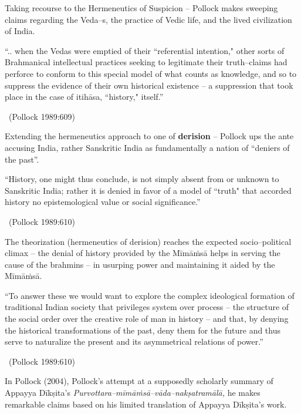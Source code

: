 Taking recourse to the Hermeneutics of Suspicion – Pollock makes sweeping claims regarding the Veda–s, the practice of Vedic life, and the lived civilization of India.

\begin{myquote}
“.. when the Vedas were emptied of their “referential intention," other sorts of Brahmanical intellectual practices seeking to legitimate their truth–claims had perforce to conform to this special model of what counts as knowledge, and so to suppress the evidence of their own historical existence – a suppression that took place in the case of itihāsa, “history," itself.” 

~\hfill (Pollock 1989:609)
\end{myquote}

Extending the hermeneutics approach to one of \textbf{derision }– Pollock ups the ante accusing India, rather Sanskritic India as fundamentally a nation of “deniers of the past”.

\begin{myquote}
“History, one might thus conclude, is not simply absent from or unknown to Sanskritic India; rather it is denied in favor of a model of ``truth" that accorded history no epistemological value or social significance.” 

~\hfill (Pollock 1989:610)
\end{myquote}

The theorization (hermeneutics of derision) reaches the expected socio–political climax – the denial of history provided by the Mīmāṁsā helps in serving the cause of the brahmins – in usurping power and maintaining it aided by the Mīmāṁsā.

\begin{myquote}
“To answer these we would want to explore the complex ideological formation of traditional Indian society that privileges system over process – the structure of the social order over the creative role of man in history – and that, by denying the historical transformations of the past, deny them for the future and thus serve to naturalize the present and its asymmetrical relations of power.” 

~\hfill (Pollock 1989:610)
\end{myquote}

In Pollock (2004), Pollock’s attempt at a supposedly scholarly summary of Appayya Dīkṣita’s \textit{Purvottara–mīmāṁsā–vāda–nakṣatramālā,} he makes remarkable claims based on his limited translation of Appayya Dīkṣita’s work.

